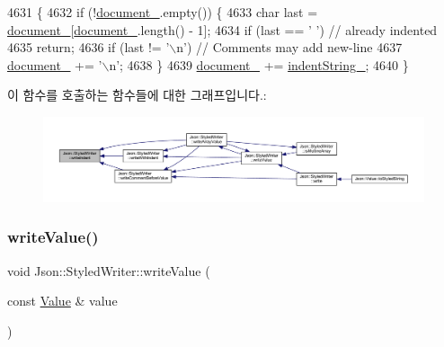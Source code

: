 \begin{DoxyCode}
4631                                \{
4632   \textcolor{keywordflow}{if} (!\hyperlink{class_json_1_1_styled_writer_ae967b0c77e4d7cb889ce7b6ee4ce28d7}{document\_}.empty()) \{
4633     \textcolor{keywordtype}{char} last = \hyperlink{class_json_1_1_styled_writer_ae967b0c77e4d7cb889ce7b6ee4ce28d7}{document\_}[\hyperlink{class_json_1_1_styled_writer_ae967b0c77e4d7cb889ce7b6ee4ce28d7}{document\_}.length() - 1];
4634     \textcolor{keywordflow}{if} (last == \textcolor{charliteral}{' '}) \textcolor{comment}{// already indented}
4635       \textcolor{keywordflow}{return};
4636     \textcolor{keywordflow}{if} (last != \textcolor{charliteral}{'\(\backslash\)n'}) \textcolor{comment}{// Comments may add new-line}
4637       \hyperlink{class_json_1_1_styled_writer_ae967b0c77e4d7cb889ce7b6ee4ce28d7}{document\_} += \textcolor{charliteral}{'\(\backslash\)n'};
4638   \}
4639   \hyperlink{class_json_1_1_styled_writer_ae967b0c77e4d7cb889ce7b6ee4ce28d7}{document\_} += \hyperlink{class_json_1_1_styled_writer_a7d91709c94c152bd44eaf80faac130ae}{indentString\_};
4640 \}
\end{DoxyCode}
이 함수를 호출하는 함수들에 대한 그래프입니다.\+:\nopagebreak
\begin{figure}[H]
\begin{center}
\leavevmode
\includegraphics[width=350pt]{class_json_1_1_styled_writer_a885f4bfb5701896d60eee6716d2db7e4_icgraph}
\end{center}
\end{figure}
\mbox{\label{class_json_1_1_styled_writer_ac40143cf43f7c4a94d3d0b41e5245069}} 
\subsubsection{\texorpdfstring{write\+Value()}{writeValue()}}
{\footnotesize\ttfamily void Json\+::\+Styled\+Writer\+::write\+Value (\begin{DoxyParamCaption}\item[{const \hyperlink{class_json_1_1_value}{Value} \&}]{value }\end{DoxyParamCaption})\hspace{0.3cm}{\ttfamily [private]}}



